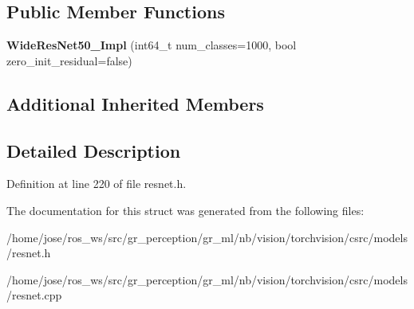 \subsection*{Public Member Functions}
\begin{DoxyCompactItemize}
\item 
\mbox{\label{structvision_1_1models_1_1WideResNet50__2Impl_af126480118537c8eaad14babf08ae7b0}} 
{\bfseries Wide\+Res\+Net50\+\_\+Impl} (int64\+\_\+t num\+\_\+classes=1000, bool zero\+\_\+init\+\_\+residual=false)
\end{DoxyCompactItemize}
\subsection*{Additional Inherited Members}


\subsection{Detailed Description}


Definition at line 220 of file resnet.\+h.



The documentation for this struct was generated from the following files\+:\begin{DoxyCompactItemize}
\item 
/home/jose/ros\+\_\+ws/src/gr\+\_\+perception/gr\+\_\+ml/nb/vision/torchvision/csrc/models/resnet.\+h\item 
/home/jose/ros\+\_\+ws/src/gr\+\_\+perception/gr\+\_\+ml/nb/vision/torchvision/csrc/models/resnet.\+cpp\end{DoxyCompactItemize}
